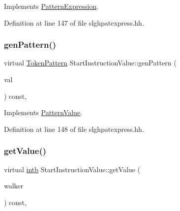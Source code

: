 Implements \mbox{\hyperlink{class_pattern_expression_a1dc2d0c07f64fdab9da6c0849e992b50}{Pattern\+Expression}}.



Definition at line 147 of file slghpatexpress.\+hh.

\mbox{\label{class_start_instruction_value_a58682ad2f7b1925cce6e70df51727fad}} 
\subsubsection{\texorpdfstring{genPattern()}{genPattern()}}
{\footnotesize\ttfamily virtual \mbox{\hyperlink{class_token_pattern}{Token\+Pattern}} Start\+Instruction\+Value\+::gen\+Pattern (\begin{DoxyParamCaption}\item[{\mbox{\hyperlink{types_8h_aa925ba3e627c2df89d5b1cfe84fb8572}{intb}}}]{val }\end{DoxyParamCaption}) const\hspace{0.3cm}{\ttfamily [inline]}, {\ttfamily [virtual]}}



Implements \mbox{\hyperlink{class_pattern_value_acc5a0c3b740a93e6ed5d3882c960ef98}{Pattern\+Value}}.



Definition at line 148 of file slghpatexpress.\+hh.

\mbox{\label{class_start_instruction_value_a3f4a8c25d278300066291616f10c355b}} 
\subsubsection{\texorpdfstring{getValue()}{getValue()}}
{\footnotesize\ttfamily virtual \mbox{\hyperlink{types_8h_aa925ba3e627c2df89d5b1cfe84fb8572}{intb}} Start\+Instruction\+Value\+::get\+Value (\begin{DoxyParamCaption}\item[{\mbox{\hyperlink{class_parser_walker}{Parser\+Walker}} \&}]{walker }\end{DoxyParamCaption}) const\hspace{0.3cm}{\ttfamily [inline]}, {\ttfamily [virtual]}}



